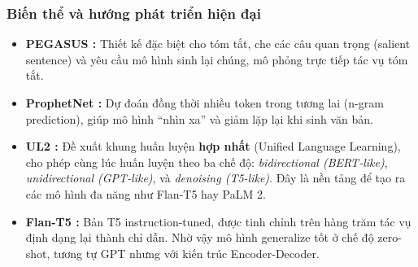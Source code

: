 \subsubsection{Biến thể và hướng phát triển hiện đại}

\begin{itemize}
	\item \textbf{PEGASUS \cite{zhang2020pegasus}:} Thiết kế đặc biệt cho tóm tắt, 
	che các câu quan trọng (salient sentence) và yêu cầu mô hình sinh lại chúng, mô phỏng trực tiếp tác vụ tóm tắt.
	
	\item \textbf{ProphetNet \cite{qi2020prophetnet}:} Dự đoán đồng thời nhiều token trong tương lai (n-gram prediction), 
	giúp mô hình “nhìn xa” và giảm lặp lại khi sinh văn bản.
	
	\item \textbf{UL2 \cite{tay2022unifying}:} Đề xuất khung huấn luyện \textbf{hợp nhất} (Unified Language Learning), 
	cho phép cùng lúc huấn luyện theo ba chế độ: \textit{bidirectional (BERT-like)}, 
	\textit{unidirectional (GPT-like)}, và \textit{denoising (T5-like)}.  
	Đây là nền tảng để tạo ra các mô hình đa năng như Flan-T5 hay PaLM 2.
	
	\item \textbf{Flan-T5 \cite{chung2022scaling}:} Bản T5 instruction-tuned,
	được tinh chỉnh trên hàng trăm tác vụ định dạng lại thành chỉ dẫn.
	Nhờ vậy mô hình generalize tốt ở chế độ zero-shot, tương tự GPT nhưng với kiến trúc Encoder-Decoder.
\end{itemize}

